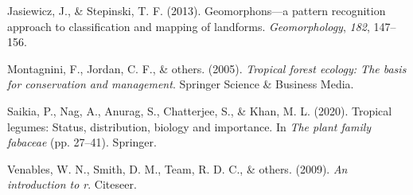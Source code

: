 \documentclass[11pt,]{article}
\begin{document}
\hypertarget{ref-jasiewicz2013geomorphons}{}
Jasiewicz, J., \& Stepinski, T. F. (2013). Geomorphons---a pattern
recognition approach to classification and mapping of landforms.
\emph{Geomorphology}, \emph{182}, 147--156.

\hypertarget{ref-montagnini2005tropical}{}
Montagnini, F., Jordan, C. F., \& others. (2005). \emph{Tropical forest
ecology: The basis for conservation and management}. Springer Science \&
Business Media.

\hypertarget{ref-saikia2020tropical}{}
Saikia, P., Nag, A., Anurag, S., Chatterjee, S., \& Khan, M. L. (2020).
Tropical legumes: Status, distribution, biology and importance. In
\emph{The plant family fabaceae} (pp. 27--41). Springer.

\hypertarget{ref-venables2009introduction}{}
Venables, W. N., Smith, D. M., Team, R. D. C., \& others. (2009).
\emph{An introduction to r}. Citeseer.




\newpage
\singlespacing 
\end{document}
